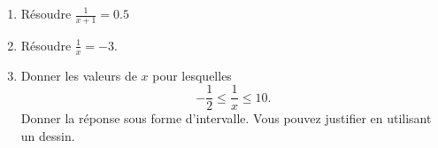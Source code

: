 
\begin{exercice}\label{exosmath-0258}

    \begin{enumerate}
        \item
            Résoudre \( \frac{1}{ x+1 }=0.5\)
        \item
            Résoudre \( \frac{1}{ x }=-3\).
        \item
            Donner les valeurs de \( x\) pour lesquelles
            \begin{equation}
                -\frac{ 1 }{2}\leq \frac{1}{ x }\leq 10.
            \end{equation}
            Donner la réponse sous forme d'intervalle. Vous pouvez justifier en utilisant un dessin.
    \end{enumerate}

\end{exercice}
